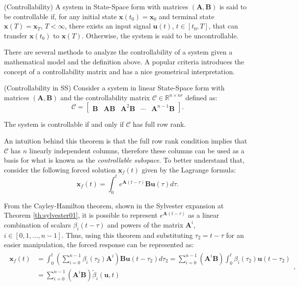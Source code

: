 \documentclass[a4paper,11pt]{book}
\numberwithin{figure}{chapter}
\numberwithin{equation}{chapter}
\numberwithin{table}{chapter}
\newtheorem{theorem}{Theorem}[chapter]
\theoremstyle{definition}
\newtheorem{definition}{Definition}[chapter]
\newcounter{boxed-theorem}
\newenvironment{boxed-theorem}[1]
{\colorlet{shadecolor}{pastelBlue2!10} \begin{shaded} \begin{theorem}{#1}}
{\end{theorem} \end{shaded}}
\newcounter{boxed-definition}
\newenvironment{boxed-definition}[1]
{\colorlet{shadecolor}{pastelYellow!15} \begin{shaded} \begin{definition}{#1}}
{\end{definition} \end{shaded}}
\newcounter{boxed-example}
\begin{document}
\begin{boxed-definition}{(Controllability)}
    A system in State-Space form with matrices $(\bm{A}, \bm{B})$ is said to be controllable if, for any initial state $\bm{x}(t_0) = \bm{x}_0$ and terminal state $\bm{x}(T) = \bm{x}_T$, $T < \infty$, there exists an input signal $\bm{u}(t)$, $t \in [t_0, T]$, that can transfer $\bm{x}(t_0)$ to $\bm{x}(T)$. Otherwise, the system is said to be uncontrollable. 
\end{boxed-definition}

There are several methods to analyze the controllability of a system given a mathematical model and the definition above. A popular criteria introduces the concept of a controllability matrix and has a nice geometrical interpretation.

\begin{boxed-theorem}{(Controllability in SS)}
    Consider a system in linear State-Space form with matrices $(\bm{A}, \bm{B})$ and the controllability matrix $\bm{\mathcal{C}} \in \mathbb{R}^{n \times nr}$ defined as:
    \begin{equation}
        \bm{\mathcal{C}} = \begin{bmatrix} \bm{B} & \bm{A} \bm{B} & \bm{A}^2 \bm{B} & \cdots & \bm{A}^{n-1} \bm{B} \end{bmatrix}
    .\end{equation}
    
    The system is controllable if and only if $\bm{\mathcal{C}}$ has full row rank.
\end{boxed-theorem}   

An intuition behind this theorem is that the full row rank condition implies that $\mathcal{C}$ has $n$ linearly independent columns, therefore these columns can be used as a basis for what is known as the \textit{controllable subspace}. To better understand that, consider the following forced solution $\bm{x}_f(t)$ given by the Lagrange formula:
\begin{equation}
    \bm{x}_f(t) = \int_{0}^{t} e^{\bm{A} (t-\tau)} \bm{B} \bm{u}(\tau) d\tau
.\end{equation}

From the Cayley-Hamilton theorem, shown in the Sylvester expansion at Theorem \ref{th:sylvester01}, it is possible to represent $e^{\bm{A}(t-\tau)}$ as a linear combination of scalars $\beta_i(t-\tau)$ and powers of the matrix $\bm{A}^i$, $i \in [0, 1,..., n-1]$. Thus, using this theorem and substituting $\tau_2 = t - \tau$ for an easier manipulation, the forced response can be represented as:
\begin{align}
\begin{split}
    \bm{x}_f(t) &= \int_{0}^{t} \left( \sum_{i=0}^{n-1} \beta_i(\tau_2) \bm{A}^i \right) \bm{B} \bm{u}(t - \tau_2) d\tau_2 = \sum_{i=0}^{n-1} \left( \bm{A}^i \bm{B} \right) \int_{0}^{t} \beta_i(\tau_2) \bm{u}(t - \tau_2)  \\
        &= \sum_{i=0}^{n-1} \left( \bm{A}^i \bm{B} \right) \tilde{\beta}_i(\bm{u}, t)
\end{split}
,\end{align}
\end{document}
